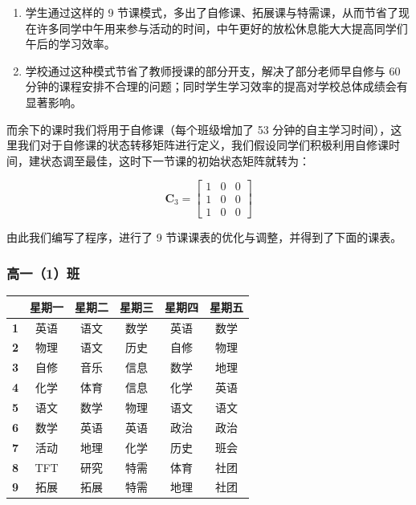\documentclass[a4paper]{article}
\let\mat\boldsymbol %
\begin{document}
  \begin{enumerate}

  \item 学生通过这样的 9 节课模式，多出了自修课、拓展课与特需课，从而节省了现在许多同学中午用来参与活动的时间，中午更好的放松休息能大大提高同学们午后的学习效率。

  \item 学校通过这种模式节省了教师授课的部分开支，解决了部分老师早自修与 60 分钟的课程安排不合理的问题；同时学生学习效率的提高对学校总体成绩会有显著影响。

  \end{enumerate}

  而余下的课时我们将用于自修课（每个班级增加了 53 分钟的自主学习时间），这里我们对于自修课的状态转移矩阵进行定义，我们假设同学们积极利用自修课时间，建状态调至最佳，这时下一节课的初始状态矩阵就转为：

  \begin{equation}
  \mat{C}_3=
  \begin{bmatrix}
  1 & 0 & 0 \\
  1 & 0 & 0 \\
  1 & 0 & 0
  \end{bmatrix}
  \end{equation}

  由此我们编写了程序，进行了 9 节课课表的优化与调整，并得到了下面的课表。

  \clearpage

  \subsubsection{高一（1）班}

   \begin{tabular}{cccccc}
   \toprule
   & \bf 星期一 & \bf 星期二 & \bf 星期三 & \bf 星期四 & \bf 星期五 \\
   \midrule
   \bf 1 & 英语 & 语文 & 数学 & 英语 & 数学 \\
   \bf 2 & 物理 & 语文 & 历史 & 自修 & 物理 \\
   \bf 3 & 自修 & 音乐 & 信息 & 数学 & 地理 \\
   \bf 4 & 化学 & 体育 & 信息 & 化学 & 英语 \\
   \bf 5 & 语文 & 数学 & 物理 & 语文 & 语文 \\
   \midrule
   \bf 6 & 数学 & 英语 & 英语 & 政治 & 政治 \\
   \bf 7 & 活动 & 地理 & 化学 & 历史 & 班会 \\
   \bf 8 & TFT  & 研究 & 特需 & 体育 & 社团 \\
   \bf 9 & 拓展 & 拓展 & 特需 & 地理 & 社团 \\
   \bottomrule
   \end{tabular}
\end{document}
